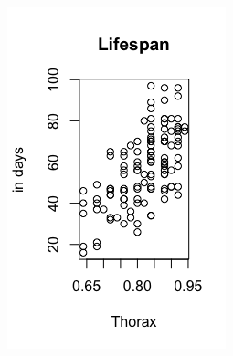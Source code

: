 \documentclass[12pt,letterpaper]{article}
\begin{document}
\begin{enumerate}
		\includegraphics[width=\linewidth]{lifespan-thorax.png}
		

\end{enumerate}
\end{document}
